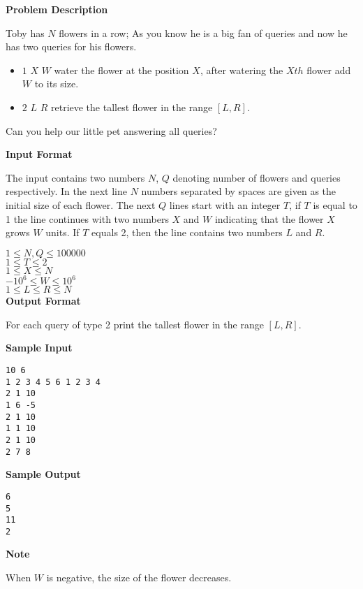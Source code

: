 \textbf{\large Problem Description}

Toby has $N$ flowers in a row; As you know he is a big fan of queries and now
he has two queries for his flowers.

\begin{itemize}
    \item $1$ $X$ $W$ water the flower at the position $X$, after watering the $Xth$ flower add $W$ to its size.
    \item $2$ $L$ $R$ retrieve the tallest flower in the range $[L, R]$.
\end{itemize}

Can you help our little pet answering all queries?

\textbf{\large Input Format}

The input contains two numbers $N$, $Q$ denoting number of flowers and queries
respectively. In the next line $N$ numbers separated by spaces are given as the initial size of each flower.
The next $Q$ lines start with an integer $T$, if $T$ is equal to 1 the line continues with
two numbers $X$ and $W$ indicating that the flower $X$ grows $W$ units. If $T$ equals 2, then
the line contains two numbers $L$ and $R$.

$1 \le N, Q \le 100000$ \\
$1 \le T \le 2 $\\
$1 \le X \le N$ \\
$-10^6 \le W \le 10^6$\\
$1 \le L \le R \le N $\\

\textbf{\large Output Format}

For each query of type 2 print the tallest flower in the range $[L, R]$.

\textbf{\large Sample Input}

\begin{verbatim}
10 6
1 2 3 4 5 6 1 2 3 4
2 1 10
1 6 -5
2 1 10
1 1 10
2 1 10
2 7 8
\end{verbatim}

\textbf{\large Sample Output}

\begin{verbatim}
6
5
11
2
\end{verbatim}

\textbf{\large Note}

When $W$ is negative, the size of the flower decreases.

\newpage
